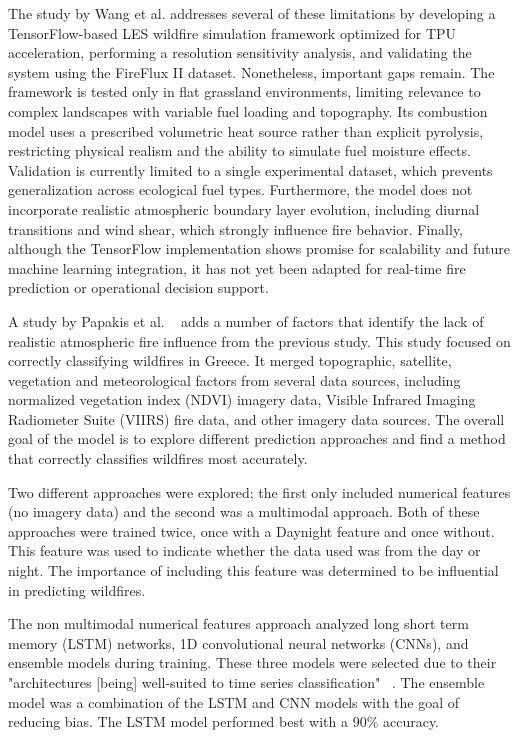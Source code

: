 \documentclass[conference]{IEEEtran}
\begin{document}
The study by Wang et al. \citep{wang2023high} addresses several of these limitations by developing a TensorFlow-based LES wildfire simulation framework optimized for TPU acceleration, performing a resolution sensitivity analysis, and validating the system using the FireFlux II dataset. Nonetheless, important gaps remain. The framework is tested only in flat grassland environments, limiting relevance to complex landscapes with variable fuel loading and topography. Its combustion model uses a prescribed volumetric heat source rather than explicit pyrolysis, restricting physical realism and the ability to simulate fuel moisture effects. Validation is currently limited to a single experimental dataset, which prevents generalization across ecological fuel types. Furthermore, the model does not incorporate realistic atmospheric boundary layer evolution, including diurnal transitions and wind shear, which strongly influence fire behavior. Finally, although the TensorFlow implementation shows promise for scalability and future machine learning integration, it has not yet been adapted for real-time fire prediction or operational decision support.

A study by Papakis et al. \ \cite{papakis2025AMultimodalEnsembleDeepLearning}  adds a number of factors that identify the lack of realistic atmospheric fire influence from the previous study. This study focused on correctly classifying wildfires in Greece. It merged topographic, satellite, vegetation and meteorological factors from several data sources, including normalized vegetation index (NDVI) imagery data, Visible Infrared Imaging Radiometer Suite (VIIRS) fire data, and other imagery data sources. The overall goal of the model is to explore different prediction approaches and find a method that correctly classifies wildfires most accurately.

Two different approaches were explored; the first only included numerical features (no imagery data) and the second was a multimodal approach. Both of these approaches were trained twice, once with a Daynight feature and once without. This feature was used to indicate whether the data used was from the day or night. The importance of including this feature was determined to be influential in predicting wildfires. 

The non multimodal numerical features approach analyzed long short term memory (LSTM) networks, 1D convolutional neural networks (CNNs), and ensemble models during training. These three models were selected due to their "architectures [being] well-suited to time series classification" \ \cite{papakis2025AMultimodalEnsembleDeepLearning}. The ensemble model was a combination of the LSTM and CNN models with the goal of reducing bias. The LSTM model performed best with a 90\% accuracy. 
\end{document}
